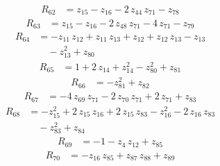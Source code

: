 \begin{equation*}\begin{aligned}
R_{62}&=z_{15} -z_{16} -2\,z_{44}\,z_{71} -z_{78}
\end{aligned}\end{equation*}
\begin{equation*}\begin{aligned}
R_{63}&=z_{15} -z_{16} -2\,z_{48}\,z_{71} -4\,z_{71} -z_{79}
\end{aligned}\end{equation*}
\begin{equation*}\begin{aligned}
R_{64}&=-z_{11}\,z_{12} +z_{11}\,z_{13} +z_{12} +z_{12}\,z_{13} -z_{13} \\
&\quad -z_{13}^{2} +z_{80}
\end{aligned}\end{equation*}
\begin{equation*}\begin{aligned}
R_{65}&=1 +2\,z_{14} +z_{14}^{2} -z_{80}^{2} +z_{81}
\end{aligned}\end{equation*}
\begin{equation*}\begin{aligned}
R_{66}&=-z_{81}^{2} +z_{82}
\end{aligned}\end{equation*}
\begin{equation*}\begin{aligned}
R_{67}&=-4\,z_{69}\,z_{71} -2\,z_{70}\,z_{71} +2\,z_{71} +z_{83}
\end{aligned}\end{equation*}
\begin{equation*}\begin{aligned}
R_{68}&=-z_{15}^{2} +2\,z_{15}\,z_{16} +2\,z_{15}\,z_{83} -z_{16}^{2} -2\,z_{16}\,z_{83} \\
&\quad -z_{83}^{2} +z_{84}
\end{aligned}\end{equation*}
\begin{equation*}\begin{aligned}
R_{69}&=-1 -z_{4}\,z_{12} +z_{85}
\end{aligned}\end{equation*}
\begin{equation*}\begin{aligned}
R_{70}&=-z_{16}\,z_{85} +z_{87}\,z_{88} +z_{89}
\end{aligned}\end{equation*}
